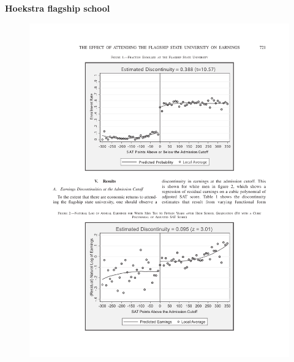 \documentclass[notes=show]{beamer}
\begin{document}
\begin{frame}[plain]
\begin{center}
\textbf{Hoekstra flagship school}
\end{center}

	\begin{figure}
	\includegraphics[scale=0.75]{./lecture_includes/rdd_hoekstra1.pdf}
	\end{figure}

\end{frame}
\end{document}
